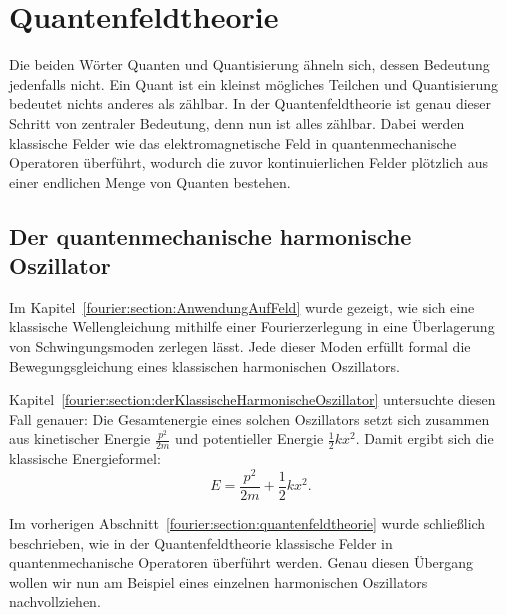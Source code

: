 %
%
%
%
\section{Quantenfeldtheorie\label{fourier:section:quantenfeldtheorie}}
Die beiden Wörter Quanten und Quantisierung ähneln sich, dessen Bedeutung jedenfalls nicht. 
Ein Quant ist ein kleinst mögliches Teilchen und Quantisierung bedeutet nichts anderes als zählbar. 
In der Quantenfeldtheorie ist genau dieser Schritt von zentraler Bedeutung, denn nun ist alles zählbar. 
Dabei werden klassische Felder wie das elektromagnetische Feld in quantenmechanische Operatoren überführt, wodurch die zuvor kontinuierlichen Felder plötzlich aus einer endlichen Menge von Quanten bestehen.

\subsection{Der quantenmechanische harmonische Oszillator\label{fourier:subsection:derQMHarmonischeOszillator}}

Im Kapitel~\ref{fourier:section:AnwendungAufFeld} wurde gezeigt, wie sich eine klassische Wellengleichung mithilfe einer Fourierzerlegung in eine Überlagerung von Schwingungsmoden zerlegen lässt.  
Jede dieser Moden erfüllt formal die Bewegungsgleichung eines klassischen harmonischen Oszillators.

Kapitel~\ref{fourier:section:derKlassischeHarmonischeOszillator} untersuchte diesen Fall genauer:  
Die Gesamtenergie eines solchen Oszillators setzt sich zusammen aus kinetischer Energie \( \frac{p^2}{2m} \) und potentieller Energie \( \frac{1}{2}kx^2 \).  
Damit ergibt sich die klassische Energieformel:
\begin{equation}
E = \frac{p^2}{2m} + \frac{1}{2}kx^2.
\end{equation}

Im vorherigen Abschnitt~\ref{fourier:section:quantenfeldtheorie} wurde schließlich beschrieben, wie in der Quantenfeldtheorie klassische Felder in quantenmechanische Operatoren überführt werden.  
Genau diesen Übergang wollen wir nun am Beispiel eines einzelnen harmonischen Oszillators nachvollziehen.

\vspace{1em}

